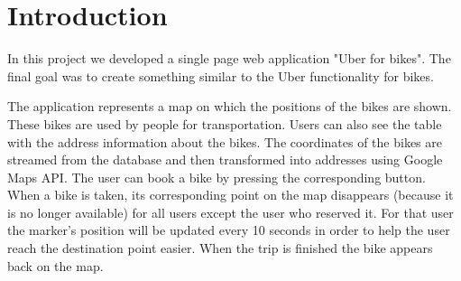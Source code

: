 \section{Introduction}

In this project we developed a single page web application "Uber for bikes". The final goal was to create something similar to the Uber functionality for bikes.

The application represents a map on which the positions of the bikes are shown. These bikes are used by people
for transportation. Users can also see the table with the address information about the bikes. The coordinates of the bikes are streamed from the database and then transformed into addresses using Google Maps API. The user can book a bike by pressing the corresponding button. When a bike is taken, its corresponding point on the map disappears (because it is no longer available) for all users except the user who reserved it. For that user the marker's position will be updated every 10 seconds in order to help the user reach the destination point easier. When the trip is finished the bike appears back on the map. 
